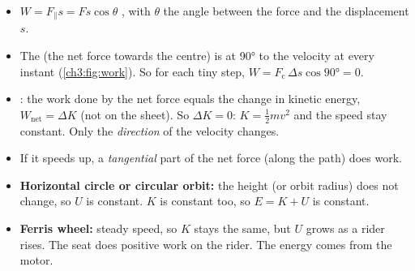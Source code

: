 \begin{sidebyside}[0.27]
  \centering
  \label{ch3:fig:work}
\nextside
  \begin{itemize}
    \item $W = F_\parallel s = Fs\cos\theta$ \hscbadgeonsheet, with $\theta$ the angle between
          the force and the displacement $s$.
    \item The  (the net force towards the centre) is at \ang{90} to the
          velocity at every instant (\cref{ch3:fig:work}). So for each tiny step,
          $W = F_\mathrm{c}\,\Delta s\cos\ang{90} = 0$.
    \item {}: the work done by the net force equals the change in
          kinetic energy, $W_\mathrm{net} = \Delta K$ (not on the sheet). So
          $\Delta K = 0$: $K = \tfrac{1}{2}mv^2$ and the speed stay constant. Only the
          \emph{direction} of the velocity changes.
  \end{itemize}
\end{sidebyside}

\begin{itemize}
  \item If it speeds up, a \emph{tangential} part of the net force (along the path) does work.
  \item \textbf{Horizontal circle or circular orbit:} the height (or orbit radius) does not
        change, so $U$ is constant. $K$ is constant too, so $E = K + U$ is constant.
  \item \textbf{Ferris wheel:} steady speed, so $K$ stays the same, but $U$ grows as a rider
        rises. The seat does positive work on the rider. The energy comes from the motor.
\end{itemize}

